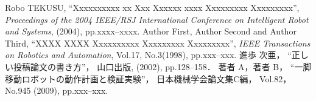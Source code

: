 \documentclass[a4jsme]{jsmepaper}
\begin{document}
{\small
\begin{thebibliography}{99}
%
    Robo TEKUSU,
    ``Xxxxxxxxxx xx Xxx Xxxxxx xxxx Xxxxxxxxx Xxxxxxxxx'',
    {\it Proceedings of the 2004 IEEE/RSJ International
    Conference on Intelligent Robot and Systems},
    (2004), pp.xxxx--xxxx.
%
    Author First, Author Second and Author Third,
    ``XXXX XXXX Xxxxxxxxxx Xxxxxxxxx Xxxxxxxxx'',
    {\it IEEE Transactions on Robotics and Automation},
    Vol.17, No.3(1998), pp.xxx--xxx.
%
    進歩 次亜，
    “正しい投稿論文の書き方”，
    山口出版, (2002),
    pp.128--158．
%
    著者 A，著者 B，
    “一脚移動ロボットの動作計画と検証実験”，
    日本機械学会論文集C編，
    Vol.82，No.945 (2009), pp.xxx--xxx.
\end{thebibliography}}
\end{document}
